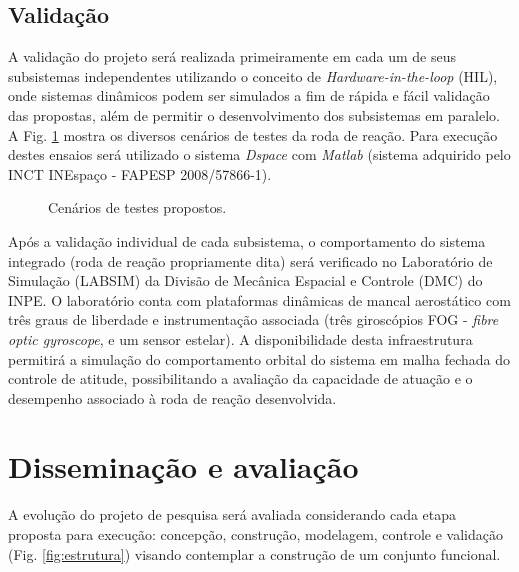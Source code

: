 \subsection{Validação}


A validação do projeto será realizada primeiramente em cada um de seus subsistemas independentes utilizando o conceito de \textit{Hardware-in-the-loop} (HIL), onde sistemas dinâmicos podem ser simulados a fim de rápida e fácil validação das propostas, além de permitir o desenvolvimento dos subsistemas em paralelo. A Fig. \ref{fig:testes_cenarios} mostra os diversos cenários de testes da roda de reação. Para execução destes ensaios será utilizado o sistema \textit{Dspace} com \textit{Matlab} (sistema adquirido pelo INCT INEspaço - FAPESP 2008/57866-1).

\begin{figure}[h!]  
	\centering
	\caption{Cenários de testes propostos. 
	}
	\label{fig:testes_cenarios}
	
\end{figure}

Após a validação individual de cada subsistema, o comportamento do sistema integrado (roda de reação propriamente dita) será verificado no Laboratório de Simulação (LABSIM) da Divisão de Mecânica Espacial e Controle (DMC) do INPE. O laboratório conta com  plataformas dinâmicas de mancal aerostático com três graus de liberdade e instrumentação associada (três giroscópios FOG - \textit{fibre optic gyroscope}, e um sensor estelar). A disponibilidade desta infraestrutura permitirá a simulação do comportamento orbital do sistema em malha fechada do controle de atitude, possibilitando a avaliação da capacidade de atuação e o desempenho associado à roda de reação desenvolvida.

\section{Disseminação e avaliação}

A evolução do projeto de pesquisa será avaliada considerando cada etapa proposta para execução: concepção, construção, modelagem, controle e validação (Fig. \ref{fig:estrutura}) visando contemplar a construção de um conjunto funcional.
 
